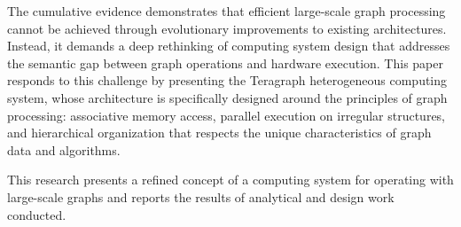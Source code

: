The cumulative evidence demonstrates that efficient large-scale graph processing cannot be achieved through evolutionary improvements to existing architectures. Instead, it demands a deep rethinking of computing system design that addresses the semantic gap between graph operations and hardware execution. This paper responds to this challenge by presenting the Teragraph heterogeneous computing system, whose architecture is specifically designed around the principles of graph processing: associative memory access, parallel execution on irregular structures, and hierarchical organization that respects the unique characteristics of graph data and algorithms.

This research presents a refined concept of a computing system \cite{popovTeragraphHeterogeneousSystem2022,popovIntroductionMISDTechnology2017} for operating with large-scale graphs and reports the results of analytical and design work conducted.
